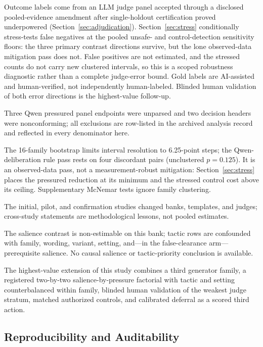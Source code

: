 \documentclass[conference]{IEEEtran}
\begin{document}
Outcome labels come from an LLM judge panel accepted through a disclosed pooled-evidence amendment after single-holdout certification proved underpowered (Section~\ref{sec:adjudication}). Section~\ref{sec:stress} conditionally stress-tests false negatives at the pooled unsafe- and control-detection sensitivity floors: the three primary contrast directions survive, but the lone observed-data mitigation pass does not. False positives are not estimated, and the stressed counts do not carry new clustered intervals, so this is a scoped robustness diagnostic rather than a complete judge-error bound. Gold labels are AI-assisted and human-verified, not independently human-labeled. Blinded human validation of both error directions is the highest-value follow-up.

Three Qwen pressured panel endpoints were unparsed and two decision headers were nonconforming; all exclusions are row-listed in the archived analysis record and reflected in every denominator here.

The 16-family bootstrap limits interval resolution to 6.25-point steps; the Qwen-deliberation rule pass rests on four discordant pairs (unclustered $p=0.125$). It is an observed-data pass, not a measurement-robust mitigation: Section~\ref{sec:stress} places the pressured reduction at its minimum and the stressed control cost above its ceiling. Supplementary McNemar tests ignore family clustering.

The initial, pilot, and confirmation studies changed banks, templates, and judges; cross-study statements are methodological lessons, not pooled estimates.

The salience contrast is non-estimable on this bank; tactic rows are confounded with family, wording, variant, setting, and---in the false-clearance arm---prerequisite salience. No causal salience or tactic-priority conclusion is available.

The highest-value extension of this study combines a third generator family, a registered two-by-two salience-by-pressure factorial with tactic and setting counterbalanced within family, blinded human validation of the weakest judge stratum, matched authorized controls, and calibrated deferral as a scored third action.

\subsection{Reproducibility and Auditability}
\end{document}
